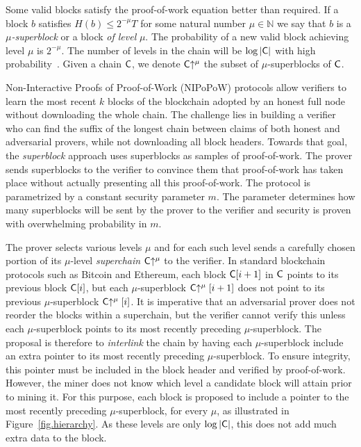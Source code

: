 Some valid blocks satisfy the proof-of-work equation better than required. If
a block $b$ satisfies $H(b) \leq 2^{-\mu} T$ for some natural number
$\mu \in \mathbb{N}$ we say that $b$ is a \emph{$\mu$-superblock} or a block
\emph{of level} $\mu$. The probability of a new valid block achieving level
$\mu$ is $2^{-\mu}$. The number of levels in the chain will be $\log|\mathsf{C}|$
with high probability~\cite{popow}. Given a chain $\mathsf{C}$, we denote
$\mathsf{C}\negthickspace\uparrow^\mu$ the subset of $\mu$-superblocks of $\mathsf{C}$.

Non-Interactive Proofs of Proof-of-Work (NIPoPoW) protocols allow verifiers to
learn the most recent $k$ blocks of the blockchain adopted by an honest full
node without downloading the whole chain. The challenge lies in building a
verifier who can find the suffix of the longest chain between claims of both
honest and adversarial provers, while not downloading all block headers. Towards
that goal, the \emph{superblock} approach uses superblocks as samples of
proof-of-work. The prover sends superblocks to the verifier to convince them
that proof-of-work has taken place without actually presenting all this
proof-of-work. The protocol is parametrized by a constant security parameter
$m$. The parameter determines how many superblocks will be sent by the prover to
the verifier and security is proven with overwhelming probability in $m$.

The prover selects various levels $\mu$ and for each such level sends a
carefully chosen portion of its $\mu$-level \emph{superchain}
$\mathsf{C}\negthickspace\uparrow^\mu$ to the verifier. In standard blockchain protocols such as
Bitcoin and Ethereum, each block $\mathsf{C}[i + 1]$ in $\mathsf{C}$ points to its
previous block $\mathsf{C}[i]$, but each $\mu$-superblock $\mathsf{C}\negthickspace\uparrow^\mu[i +
1]$ does not point to its previous $\mu$-superblock $\mathsf{C}\negthickspace\uparrow^\mu[i]$. It
is imperative that an adversarial prover does not reorder the blocks within a
superchain, but the verifier cannot verify this unless each $\mu$-superblock
points to its most recently preceding $\mu$-superblock. The proposal is
therefore to \emph{interlink} the chain by having each $\mu$-superblock include
an extra pointer to its most recently preceding $\mu$-superblock. To ensure
integrity, this pointer must be included in the block header and verified by
proof-of-work. However, the miner does not know which level a candidate block
will attain prior to mining it. For this purpose, each block is proposed to
include a pointer to the most recently preceding $\mu$-superblock, for every
$\mu$, as illustrated in Figure~\ref{fig.hierarchy}. As these levels are only
$\log|\mathsf{C}|$, this does not add much extra data to the block.

